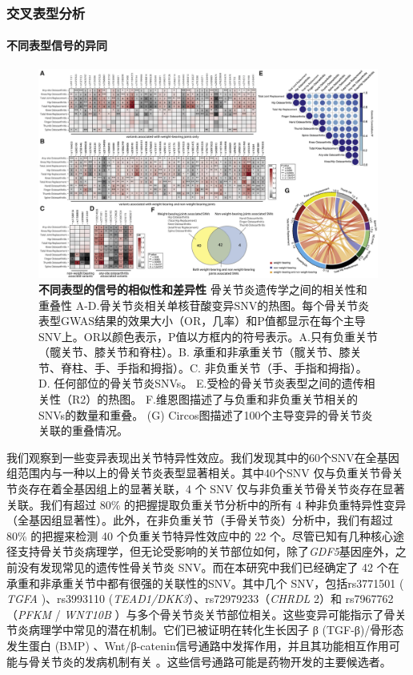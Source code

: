 \subsubsection*{交叉表型分析}

\paragraph*{不同表型信号的异同}

\begin{figure}[!ht]
	\centering
	\includegraphics[width=\textwidth]{./figures/Appendix/2.jpg}
	\caption{\textbf{不同表型的信号的相似性和差异性} 骨关节炎遗传学之间的相关性和重叠性
    A-D.骨关节炎相关单核苷酸变异SNV的热图。每个骨关节炎表型GWAS结果的效果大小（OR，几率）和P值都显示在每个主导SNV上。OR以颜色表示，P值以方框内的符号表示。A.只有负重关节（髋关节、膝关节和脊柱）。B. 承重和非承重关节（髋关节、膝关节、脊柱、手、手指和拇指）。C. 非负重关节（手、手指和拇指）。D. 任何部位的骨关节炎SNVs。
    E.受检的骨关节炎表型之间的遗传相关性（R2）的热图。
    F.维恩图描述了与负重和非负重关节相关的SNVs的数量和重叠。
    (G) Circos图描述了100个主导变异的骨关节炎关联的重叠情况。}
    \label{fig:app_2}
\end{figure}

我们观察到一些变异表现出关节特异性效应。我们发现其中的60个SNV在全基因组范围内与一种以上的骨关节炎表型显著相关。其中40个SNV
仅与负重关节骨关节炎存在着全基因组上的显著关联，4 个 SNV
仅与非负重关节骨关节炎存在显著关联。我们有超过 80\%
的把握提取负重关节分析中的所有 4
种非负重特异性变异（全基因组显著性）。此外，在非负重关节（手骨关节炎）分析中，我们有超过
80\% 的把握来检测 40 个负重关节特异性效应中的 22
个。尽管已知有几种核心途径支持骨关节炎病理学，但无论受影响的关节部位如何，除了\emph{GDF5}基因座外，之前没有发现常见的遗传性骨关节炎
SNV。而在本研究中我们已经确定了 42
个在承重和非承重关节中都有很强的关联性的SNV。其中几个 SNV，包括rs3771501
( \emph{TGFA} )、rs3993110
(\emph{TEAD1/DKK3}）、rs72979233（\emph{CHRDL} 2）和
rs7967762（\emph{PFKM} / \emph{WNT10B}
）与多个骨关节炎关节部位相关。这些变异可能指示了骨关节炎病理学中常见的潜在机制。它们已被证明在转化生长因子
β (TGF-β)/骨形态发生蛋白 (BMP)
、Wnt/β-catenin信号通路中发挥作用，并且其功能相互作用可能与骨关节炎的发病机制有关
。这些信号通路可能是药物开发的主要候选者。

